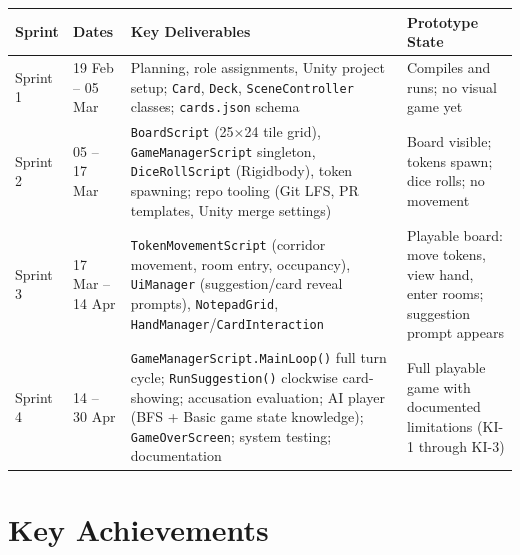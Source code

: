 \begin{longtable}{llp{5cm}p{4cm}}
\toprule
\textbf{Sprint} & \textbf{Dates} & \textbf{Key Deliverables} & \textbf{Prototype State} \\
\midrule
\endhead
Sprint 1 & 19 Feb -- 05 Mar & Planning, role assignments, Unity project setup; \texttt{Card}, \texttt{Deck}, \texttt{SceneController} classes; \texttt{cards.json} schema & Compiles and runs; no visual game yet \\
Sprint 2 & 05 -- 17 Mar & \texttt{BoardScript} (25$\times$24 tile grid), \texttt{GameManagerScript} singleton, \texttt{DiceRollScript} (Rigidbody), token spawning; repo tooling (Git LFS, PR templates, Unity merge settings) & Board visible; tokens spawn; dice rolls; no movement \\
Sprint 3 & 17 Mar -- 14 Apr & \texttt{TokenMovementScript} (corridor movement, room entry, occupancy), \texttt{UiManager} (suggestion/card reveal prompts), \texttt{NotepadGrid}, \texttt{HandManager}/\texttt{CardInteraction} & Playable board: move tokens, view hand, enter rooms; suggestion prompt appears \\
 Sprint 4 & 14 -- 30 Apr & \texttt{GameManagerScript.MainLoop()} full turn cycle; \texttt{RunSuggestion()} clockwise card-showing; accusation evaluation; AI player (BFS + Basic game state knowledge); \texttt{GameOverScreen}; system testing; documentation & Full playable game with documented limitations (KI-1 through KI-3) \\
\bottomrule
\end{longtable}

\section{Key Achievements}

